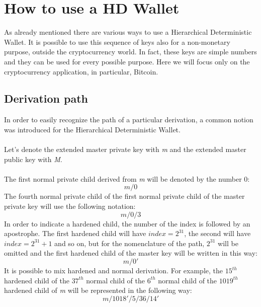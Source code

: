 
\chapter{How to use a HD Wallet} %

\label{howto} %



As already mentioned there are various ways to use a Hierarchical Deterministic Wallet. It is possible to use this sequence of keys also for a non-monetary purpose, outside the cryptocurrency world. In fact, these keys are simple numbers and they can be used for every possible purpose. Here we will focus only on the cryptocurrency application, in particular, Bitcoin.

\section{Derivation path}
In order to easily recognize the path of a particular derivation, a common notion was introduced for the Hierarchical Deterministic Wallet.
\\ \\
Let's denote the extended master private key with \textit{m} and the extended master public key with \textit{M}.
\\ \\
The first normal private child derived from \textit{m} will be denoted by the number $0$:
\begin{equation*}
m /0
\end{equation*}
The fourth normal private child of the first normal private child of the master private key will use the following notation:
\begin{equation*}
m /0/3
\end{equation*}
In order to indicate a hardened child, the number of the index is followed by an apostrophe. The first hardened child will have $index=2^{31}$, the second will have $index=2^{31}+1$ and so on, but for the nomenclature of the path, $2^{31}$ will be omitted and the first hardened child of the master key will be written in this way: 
\begin{equation*}
m /0' 
\end{equation*}
It is possible to mix hardened and normal derivation. For example, the $15^{th}$ hardened child of the $37^{th}$ normal child of the $6^{th}$ normal child of the $1019^{th}$ hardened child of \textit{m} will be represented in the following way:
\begin{equation*}
m /1018'/5/36/14'
\end{equation*}

